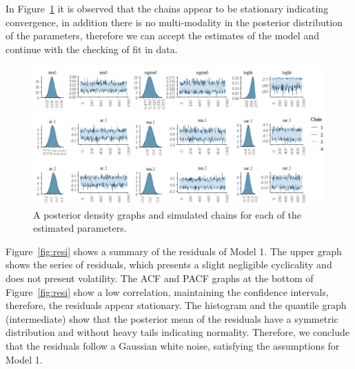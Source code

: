 In Figure~\ref{fig:combo} it is observed that the chains appear to be stationary indicating convergence, in addition there is no multi-modality in the posterior distribution of the parameters, therefore we can accept the estimates of the model and continue with the checking of fit in data.
%
\begin{figure}[!ht]
	\centering
	\includegraphics[scale=0.55]{Figs/55}
	\caption{A posterior density graphs and simulated chains for each of the estimated parameters.}
	\label{fig:combo}
\end{figure}
Figure~\ref{fig:resi} shows a summary of the residuals of Model 1. The upper graph shows the series of residuals, which presents a slight negligible cyclicality and does not present volatility. The ACF and PACF graphs at the bottom of Figure~\ref{fig:resi} show a low correlation, maintaining the confidence intervals, therefore, the residuals appear stationary. The histogram and the quantile graph (intermediate) show that the posterior mean of the residuals have a symmetric distribution and without heavy tails indicating normality. Therefore, we conclude that the residuals follow a Gaussian white noise, satisfying the assumptions for Model 1.
